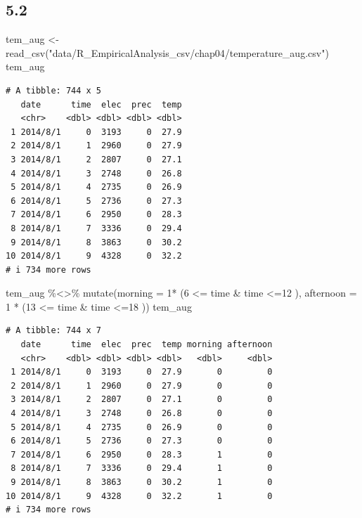 \documentclass[
  letterpaper,
  DIV=11,
  numbers=noendperiod]{scrreprt}
\newenvironment{Shaded}{\begin{snugshade}}{\end{snugshade}}
\newcommand{\AttributeTok}[1]{\textcolor[rgb]{0.40,0.45,0.13}{#1}}
\newcommand{\DecValTok}[1]{\textcolor[rgb]{0.68,0.00,0.00}{#1}}
\newcommand{\FunctionTok}[1]{\textcolor[rgb]{0.28,0.35,0.67}{#1}}
\newcommand{\NormalTok}[1]{\textcolor[rgb]{0.00,0.23,0.31}{#1}}
\newcommand{\OtherTok}[1]{\textcolor[rgb]{0.00,0.23,0.31}{#1}}
\newcommand{\SpecialCharTok}[1]{\textcolor[rgb]{0.37,0.37,0.37}{#1}}
\newcommand{\StringTok}[1]{\textcolor[rgb]{0.13,0.47,0.30}{#1}}
\begin{document}
\hypertarget{section-3}{%
\subsection{5.2}\label{section-3}}

\begin{Shaded}
\begin{Highlighting}[]
\NormalTok{tem\_aug }\OtherTok{\textless{}{-}} \FunctionTok{read\_csv}\NormalTok{(}\StringTok{"data/R\_EmpiricalAnalysis\_csv/chap04/temperature\_aug.csv"}\NormalTok{)}
\NormalTok{tem\_aug}
\end{Highlighting}
\end{Shaded}

\begin{verbatim}
# A tibble: 744 x 5
   date      time  elec  prec  temp
   <chr>    <dbl> <dbl> <dbl> <dbl>
 1 2014/8/1     0  3193     0  27.9
 2 2014/8/1     1  2960     0  27.9
 3 2014/8/1     2  2807     0  27.1
 4 2014/8/1     3  2748     0  26.8
 5 2014/8/1     4  2735     0  26.9
 6 2014/8/1     5  2736     0  27.3
 7 2014/8/1     6  2950     0  28.3
 8 2014/8/1     7  3336     0  29.4
 9 2014/8/1     8  3863     0  30.2
10 2014/8/1     9  4328     0  32.2
# i 734 more rows
\end{verbatim}

\begin{Shaded}
\begin{Highlighting}[]
\NormalTok{tem\_aug }\SpecialCharTok{\%\textless{}\textgreater{}\%}
  \FunctionTok{mutate}\NormalTok{(}\AttributeTok{morning =} \DecValTok{1}\SpecialCharTok{*}\NormalTok{ (}\DecValTok{6} \SpecialCharTok{\textless{}=}\NormalTok{ time }\SpecialCharTok{\&}\NormalTok{ time }\SpecialCharTok{\textless{}=}\DecValTok{12}\NormalTok{ ),}
         \AttributeTok{afternoon =} \DecValTok{1} \SpecialCharTok{*}\NormalTok{ (}\DecValTok{13} \SpecialCharTok{\textless{}=}\NormalTok{ time }\SpecialCharTok{\&}\NormalTok{ time }\SpecialCharTok{\textless{}=}\DecValTok{18}\NormalTok{ ))}
\NormalTok{tem\_aug}
\end{Highlighting}
\end{Shaded}

\begin{verbatim}
# A tibble: 744 x 7
   date      time  elec  prec  temp morning afternoon
   <chr>    <dbl> <dbl> <dbl> <dbl>   <dbl>     <dbl>
 1 2014/8/1     0  3193     0  27.9       0         0
 2 2014/8/1     1  2960     0  27.9       0         0
 3 2014/8/1     2  2807     0  27.1       0         0
 4 2014/8/1     3  2748     0  26.8       0         0
 5 2014/8/1     4  2735     0  26.9       0         0
 6 2014/8/1     5  2736     0  27.3       0         0
 7 2014/8/1     6  2950     0  28.3       1         0
 8 2014/8/1     7  3336     0  29.4       1         0
 9 2014/8/1     8  3863     0  30.2       1         0
10 2014/8/1     9  4328     0  32.2       1         0
# i 734 more rows
\end{verbatim}
\end{document}

